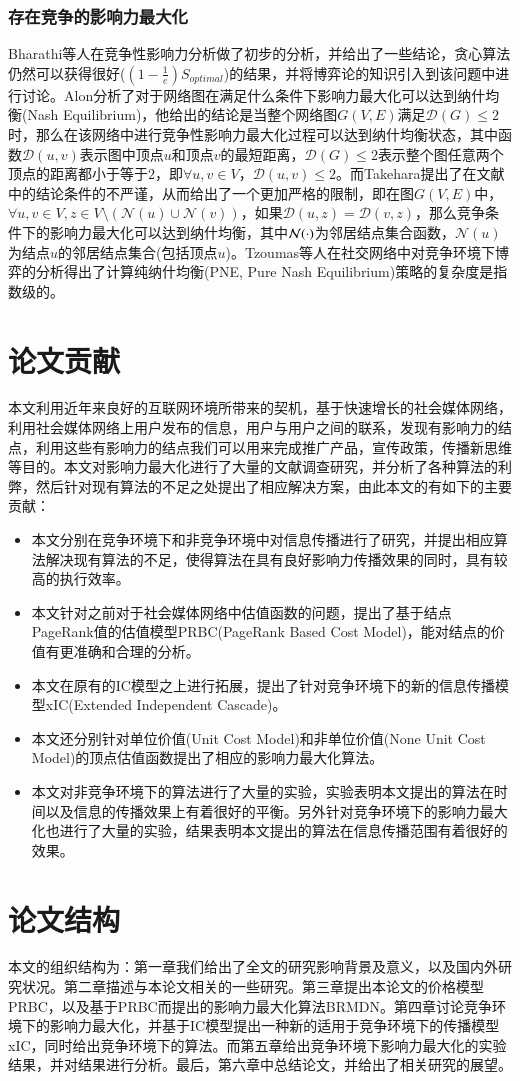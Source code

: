 \subsubsection{存在竞争的影响力最大化}
Bharathi等人在\cite{bharathi2007competitive}竞争性影响力分析做了初步的分析，并给出了一些结论，贪心算法仍然可以获得很好($(1-\frac{1}{e}) S_{optimal}$)的结果，并将博弈论的知识引入到该问题中进行讨论。Alon\cite{alon2010note}分析了对于网络图在满足什么条件下影响力最大化可以达到纳什均衡(Nash Equilibrium)，他给出的结论是当整个网络图$G(V, E)$满足$\mathcal{D}(G) \le 2$时，那么在该网络中进行竞争性影响力最大化过程可以达到纳什均衡状态，其中函数$\mathcal{D}(u, v)$表示图中顶点$u$和顶点$v$的最短距离，$\mathcal{D}(G) \le 2$表示整个图任意两个顶点的距离都小于等于$2$，即$\forall u, v \in V$，$\mathcal{D}(u,v) \le 2$。而Takehara\cite{takehara2012comment}提出了在文献\cite{alon2010note}中的结论条件的不严谨，从而给出了一个更加严格的限制，即在图$G(V, E)$中，$\forall u, v \in V, z \in V\setminus (\mathcal{N}(u)\cup\mathcal{N}(v))$，如果$\mathcal{D}(u,z)=\mathcal{D}(v,z)$，那么竞争条件下的影响力最大化可以达到纳什均衡，其中$\mathcal{N}(\boldmath\cdot)$为邻居结点集合函数，$\mathcal{N}(u)$为结点$u$的邻居结点集合(包括顶点$u$)。Tzoumas\cite{tzoumas2012game}等人在社交网络中对竞争环境下博弈的分析得出了计算纯纳什均衡(PNE, Pure Nash Equilibrium)策略的复杂度是指数级的。


\section{论文贡献}
本文利用近年来良好的互联网环境所带来的契机，基于快速增长的社会媒体网络，利用社会媒体网络上用户发布的信息，用户与用户之间的联系，发现有影响力的结点，利用这些有影响力的结点我们可以用来完成推广产品，宣传政策，传播新思维等目的。本文对影响力最大化进行了大量的文献调查研究，并分析了各种算法的利弊，然后针对现有算法的不足之处提出了相应解决方案，由此本文的有如下的主要贡献：
\begin{itemize}
\item 本文分别在竞争环境下和非竞争环境中对信息传播进行了研究，并提出相应算法解决现有算法的不足，使得算法在具有良好影响力传播效果的同时，具有较高的执行效率。
\item 本文针对之前对于社会媒体网络中估值函数的问题，提出了基于结点PageRank值的估值模型PRBC(PageRank Based Cost Model)，能对结点的价值有更准确和合理的分析。
\item 本文在原有的IC模型之上进行拓展，提出了针对竞争环境下的新的信息传播模型xIC(Extended Independent Cascade)。
\item 本文还分别针对单位价值(Unit Cost Model)和非单位价值(None Unit Cost Model)的顶点估值函数提出了相应的影响力最大化算法。
\item 本文对非竞争环境下的算法进行了大量的实验，实验表明本文提出的算法在时间以及信息的传播效果上有着很好的平衡。另外针对竞争环境下的影响力最大化也进行了大量的实验，结果表明本文提出的算法在信息传播范围有着很好的效果。
\end{itemize}



\section{论文结构}
本文的组织结构为：第一章我们给出了全文的研究影响背景及意义，以及国内外研究状况。第二章描述与本论文相关的一些研究。第三章提出本论文的价格模型PRBC，以及基于PRBC而提出的影响力最大化算法BRMDN。第四章讨论竞争环境下的影响力最大化，并基于IC模型提出一种新的适用于竞争环境下的传播模型xIC，同时给出竞争环境下的算法。而第五章给出竞争环境下影响力最大化的实验结果，并对结果进行分析。最后，第六章中总结论文，并给出了相关研究的展望。